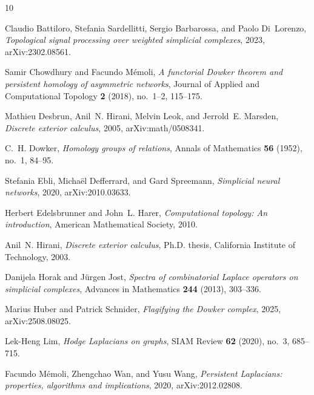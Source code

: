 \documentclass[11pt]{amsart}
\theoremstyle{plain}
\begin{document}
\providecommand{\bysame}{\leavevmode\hbox to3em{\hrulefill}\thinspace}
\providecommand{\MR}{\relax\ifhmode\unskip\space\fi MR }
\providecommand{\MRhref}[2]{%
  \href{http://www.ams.org/mathscinet-getitem?mr=#1}{#2}
}
\providecommand{\href}[2]{#2}
\begin{thebibliography}{10}

Claudio Battiloro, Stefania Sardellitti, Sergio Barbarossa, and Paolo
  Di~Lorenzo, \emph{Topological signal processing over weighted simplicial
  complexes}, 2023, arXiv:2302.08561.

Samir Chowdhury and Facundo M{\'e}moli, \emph{A functorial {D}owker theorem and
  persistent homology of asymmetric networks}, Journal of Applied and
  Computational Topology \textbf{2} (2018), no.~1--2, 115--175.

Mathieu Desbrun, Anil~N. Hirani, Melvin Leok, and Jerrold~E. Marsden,
  \emph{Discrete exterior calculus}, 2005, arXiv:math/0508341.

C.~H. Dowker, \emph{Homology groups of relations}, Annals of Mathematics
  \textbf{56} (1952), no.~1, 84--95.

Stefania Ebli, Micha{\"e}l Defferrard, and Gard Spreemann, \emph{Simplicial
  neural networks}, 2020, arXiv:2010.03633.

Herbert Edelsbrunner and John~L. Harer, \emph{Computational topology: An
  introduction}, American Mathematical Society, 2010.

Anil~N. Hirani, \emph{Discrete exterior calculus}, Ph.D. thesis, California
  Institute of Technology, 2003.

Danijela Horak and J{\"u}rgen Jost, \emph{Spectra of combinatorial {L}aplace
  operators on simplicial complexes}, Advances in Mathematics \textbf{244}
  (2013), 303--336.

Marius Huber and Patrick Schnider, \emph{Flagifying the {D}owker complex},
  2025, arXiv:2508.08025.

Lek-Heng Lim, \emph{Hodge {L}aplacians on graphs}, SIAM Review \textbf{62}
  (2020), no.~3, 685--715.

Facundo M{\'e}moli, Zhengchao Wan, and Yusu Wang, \emph{Persistent
  {L}aplacians: properties, algorithms and implications}, 2020,
  arXiv:2012.02808.


\end{thebibliography}
\end{document}
